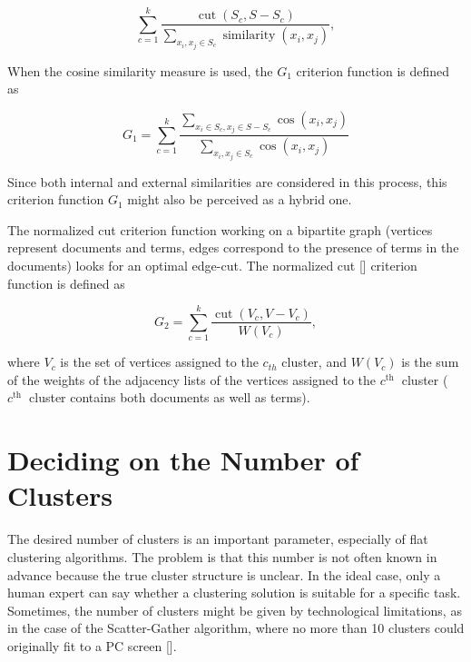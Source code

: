 \begin{equation*}
\sum_{c=1}^{k} \frac{\operatorname{cut}\left(S_{c}, S-S_{c}\right)}{\sum_{x_{i}, x_{j} \in S_{c}} \operatorname{similarity}\left(x_{i}, x_{j}\right)}, \tag{12.21}
\end{equation*}


When the cosine similarity measure is used, the $G_{1}$ criterion function is defined as


\begin{equation*}
G_{1}=\sum_{c=1}^{k} \frac{\sum_{x_{i} \in S_{c}, x_{j} \in S-S_{c}} \cos \left(x_{i}, x_{j}\right)}{\sum_{x_{i}, x_{j} \in S_{c}} \cos \left(x_{i}, x_{j}\right)} \tag{12.22}
\end{equation*}


Since both internal and external similarities are considered in this process, this criterion function $G_{1}$ might also be perceived as a hybrid one.

The normalized cut criterion function working on a bipartite graph (vertices represent documents and terms, edges correspond to the presence of terms in the documents) looks for an optimal edge-cut. The normalized cut [\cite{ref289}] criterion function is defined as


\begin{equation*}
G_{2}=\sum_{c=1}^{k} \frac{\operatorname{cut}\left(V_{c}, V-V_{c}\right)}{W\left(V_{c}\right)}, \tag{12.23}
\end{equation*}


where $V_{c}$ is the set of vertices assigned to the $c_{t h}$ cluster, and $W\left(V_{c}\right)$ is the sum of the weights of the adjacency lists of the vertices assigned to the $c^{\text {th }}$ cluster ( $c^{\text {th }}$ cluster contains both documents as well as terms).

\section{Deciding on the Number of Clusters}
The desired number of clusters is an important parameter, especially of flat clustering algorithms. The problem is that this number is not often known in advance because the true cluster structure is unclear. In the ideal case, only a human expert can say whether a clustering solution is suitable for a specific task. Sometimes, the number of clusters might be given by technological limitations, as in the case of the Scatter-Gather algorithm, where no more than 10 clusters could originally fit to a PC screen [\cite{ref185}].


